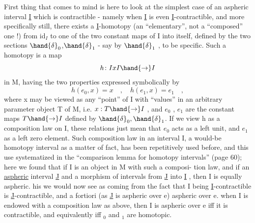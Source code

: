 First thing that comes to mind is here to look at the simplest case
of an aspheric interval  \uline{I} which is contractible  -  namely when
\uline{I} is even \uline{I}-contractible,  and more specifically still,   there exists
a \uline{I}-homotopy (an ``elementary'',  not a ``composed'' one !) 
from id$_I$ to one of the two constant maps of I into itself,  defined by the
two sections $\hand{\ensuremath{\delta}}_0$,$\hand{\ensuremath{\delta}}_1$  - say by $\hand{\ensuremath{\delta}}_1$ , to be specific.  Such a homotopy is a
map
\[ h\colon IxI \hand{\to} I \]
in M,  having the two properties expressed symbolically by
\[ h(e_0,x) = x \quad , \quad h(e_1,x) = e_1 \quad , \]
where x may be viewed as any ``point'' of I with ``values'' in an arbitrary
parameter object T of M,  i.e.  $x : T \hand{\to} I$ ,  and $e_0$ , $e_1$ are the constant
maps $T \hand{\to} I$ defined by $\hand{\ensuremath{\delta}}_0,\hand{\ensuremath{\delta}}_1$.  If we view h as a composition law on I,
these relations just mean that $e_0$ acts as a left unit,  and $e_1$ as a left
zero element.  Such composition law in an interval I,  a would-be homotopy
interval as a matter of fact,  has been repetitively used before,  and
this use systematized in the ``comparison lemma for homotopy intervals''
(page 60);  here we found that if I is an object in M with such a composi-%
tion law,  and if   an \uline{aspheric} interval \uline{J} and a morphism of intervals
from \uline{J} into \uline{I} ,  then I is equally aspheric. his we would now see as
coming from the fact that I being \uline{I}-contractible is  \uline{J}-contractible, and
a fortiori (as \uline{J} is aspheric over e) aspheric over e. 
 when I is endowed with a composition law as above, then
I is aspheric over e iff it is contractible,  and equivalently iff \hand{\ensuremath{\delta}}$_0$ and
\hand{\ensuremath{\delta}}$_1$ are homotopic. 
